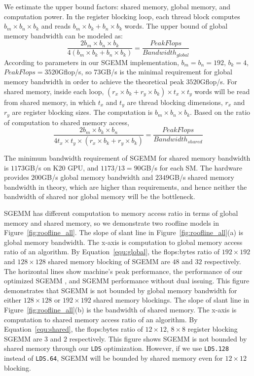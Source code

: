 We estimate the upper bound factors: 
shared memory, global memory, and computation power. In the register blocking loop, each thread block computes $b_m \times b_n \times b_k$ and reads $b_m \times b_k+b_n \times b_k$ words. The upper bound of global memory bandwidth can be modeled as:
{\footnotesize
\begin{equation}
    \frac{2 b_m \times b_n \times b_k}{4 (b_m \times b_k + b_n \times b_k)} = \frac{PeakFlops}{Bandwidth_{global}}
    \label{equ:global}
\end{equation}
}
According to parameters in our SGEMM implementation, $b_m=b_n=192$, $b_k=4$, $PeakFlops=3520$Gflop/s, so $73$GB/s is the minimal
requirement for global memory bandwidth in order to achieve the theoretical peak $3520$Gflop/s.
For shared memory, inside each loop, $(r_x \times b_k + r_y \times b_k) \times t_x \times t_y$ words will be read from shared memory, in which $t_x$ and
$t_y$ are thread blocking dimensions, $r_x$ and $r_y$ are register blocking sizes. The computation is $b_m \times b_n \times b_k$. Based on the ratio of computation to shared memory access,
{\footnotesize
\begin{equation}
    \frac{2 b_m \times b_k \times b_n}{4 t_x \times t_y \times (r_x \times b_k + r_y  \times b_k)}  = \frac{PeakFlops}{Bandwidth_{shared}}
    \label{equ:shared}
\end{equation}
}

The minimum bandwidth requirement of SGEMM for shared memory bandwidth is
$1173$GB/s on K20 GPU, and $1173/13=90$GB/s for each SM. The hardware provides
$200$GB/s global memory bandwidth and $2349$GB/s shared memory bandwidth in
theory, which are higher than requirements, and hence neither the bandwidth of
shared nor global memory will be the bottleneck.

SGEMM has different computation to memory access ratio in terms of global memory and shared memory, so we demonstrate
two roofline models in Figure~\ref{fig:roofline_all}. %
The slope of slant line in Figure~\ref{fig:roofline_all}(a) is global memory bandwidth. The x-axis is computation to global
memory access ratio of an algorithm. 
By Equation~\ref{equ:global}, the flops:bytes ratio of $192\times192$ and $128\times128$ shared 
memory blocking of SGEMM are $48$ and $32$ respectively. The horizontal lines
show machine's peak performance, the performance of our optimized SGEMM
, and SGEMM performance without dual issuing.
This figure demonstrates that SGEMM is not bounded by global memory bandwidth
for either $128\times128$ or $192\times 192$ shared memory blockings.
The slope of slant line in Figure~\ref{fig:roofline_all}(b) is the bandwidth of shared memory. The x-axis is computation to
shared memory access ratio of an algorithm. 
By Equation~\ref{equ:shared}, the flops:bytes ratio of $12\times12$, $8\times8$ register blocking SGEMM are $3$ and $2$ respectively. 
This figure shows SGEMM is not bounded by shared memory through our {\tt LDS} optimization. 
However, if we use {\tt LDS.128} instead of {\tt LDS.64}, SGEMM will be bounded by shared memory even for $12\times 12$ blocking.

